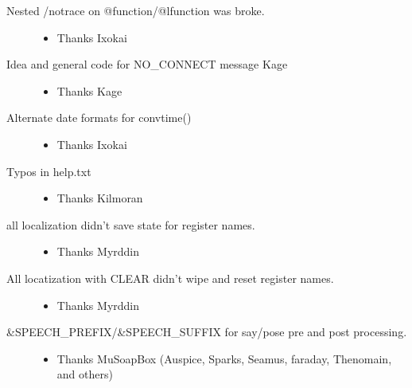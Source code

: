 \documentclass[letterpaper,10pt,english]{sphinxmanual}
\begin{document}
\begin{description}
\begin{itemize}
\end{itemize}

\item[{Nested /notrace on @function/@lfunction was broke.}] \leavevmode\begin{itemize}
\item {} 
\sphinxAtStartPar
Thanks Ixokai

\end{itemize}

\item[{Idea and general code for NO\_CONNECT message \textendash{} Kage}] \leavevmode\begin{itemize}
\item {} 
\sphinxAtStartPar
Thanks Kage

\end{itemize}

\item[{Alternate date formats for convtime()}] \leavevmode\begin{itemize}
\item {} 
\sphinxAtStartPar
Thanks Ixokai

\end{itemize}

\item[{Typos in help.txt}] \leavevmode\begin{itemize}
\item {} 
\sphinxAtStartPar
Thanks Kilmoran

\end{itemize}

\item[{all localization didn’t save state for register names.}] \leavevmode\begin{itemize}
\item {} 
\sphinxAtStartPar
Thanks Myrddin

\end{itemize}

\item[{All locatization with CLEAR didn’t wipe and reset register names.}] \leavevmode\begin{itemize}
\item {} 
\sphinxAtStartPar
Thanks Myrddin

\end{itemize}

\item[{\&SPEECH\_PREFIX/\&SPEECH\_SUFFIX for say/pose pre and post processing.}] \leavevmode\begin{itemize}
\item {} 
\sphinxAtStartPar
Thanks MuSoapBox (Auspice, Sparks, Seamus, faraday, Thenomain, and others)


\end{itemize}
\end{description}
\end{document}
